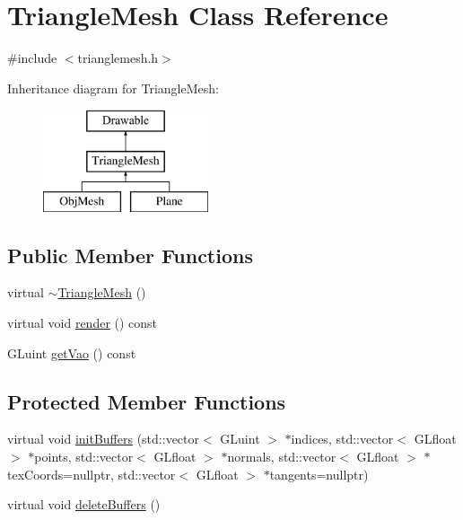 \hypertarget{class_triangle_mesh}{}\section{Triangle\+Mesh Class Reference}
\label{class_triangle_mesh}


{\ttfamily \#include $<$trianglemesh.\+h$>$}

Inheritance diagram for Triangle\+Mesh\+:\begin{figure}[H]
\begin{center}
\leavevmode
\includegraphics[height=3.000000cm]{class_triangle_mesh}
\end{center}
\end{figure}
\subsection*{Public Member Functions}
\begin{DoxyCompactItemize}
\item 
virtual \mbox{\hyperlink{class_triangle_mesh_ad2e6daebfd73b0f3cf832b13a2bf300d}{$\sim$\+Triangle\+Mesh}} ()
\item 
virtual void \mbox{\hyperlink{class_triangle_mesh_acd43f84016ec88e288df4c0f6739fc70}{render}} () const
\item 
G\+Luint \mbox{\hyperlink{class_triangle_mesh_a6f1bd6279aa61bd2cf0b8a72c8d3035f}{get\+Vao}} () const
\end{DoxyCompactItemize}
\subsection*{Protected Member Functions}
\begin{DoxyCompactItemize}
\item 
virtual void \mbox{\hyperlink{class_triangle_mesh_a4b115a2f023767efab11cfb44d8eb4c4}{init\+Buffers}} (std\+::vector$<$ G\+Luint $>$ $\ast$indices, std\+::vector$<$ G\+Lfloat $>$ $\ast$points, std\+::vector$<$ G\+Lfloat $>$ $\ast$normals, std\+::vector$<$ G\+Lfloat $>$ $\ast$tex\+Coords=nullptr, std\+::vector$<$ G\+Lfloat $>$ $\ast$tangents=nullptr)
\item 
virtual void \mbox{\hyperlink{class_triangle_mesh_ac92596aaae30b94eb274fd3e267c7387}{delete\+Buffers}} ()
\end{DoxyCompactItemize}
